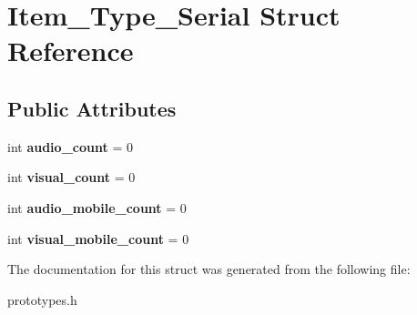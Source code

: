 \hypertarget{struct_item___type___serial}{}\section{Item\+\_\+\+Type\+\_\+\+Serial Struct Reference}
\label{struct_item___type___serial}
\subsection*{Public Attributes}
\begin{DoxyCompactItemize}
\item 
\mbox{\label{struct_item___type___serial_a622d410cdab4628fa131a61796f1613e}} 
int {\bfseries audio\+\_\+count} = 0
\item 
\mbox{\label{struct_item___type___serial_a3b8c1cc9b2d2e0e55cf7d37b8c965a99}} 
int {\bfseries visual\+\_\+count} = 0
\item 
\mbox{\label{struct_item___type___serial_a9b4542d4191a1f85d2c8460f482228f5}} 
int {\bfseries audio\+\_\+mobile\+\_\+count} = 0
\item 
\mbox{\label{struct_item___type___serial_ae57046b7a7afa72262358b690b068ada}} 
int {\bfseries visual\+\_\+mobile\+\_\+count} = 0
\end{DoxyCompactItemize}


The documentation for this struct was generated from the following file\+:\begin{DoxyCompactItemize}
\item 
prototypes.\+h\end{DoxyCompactItemize}
